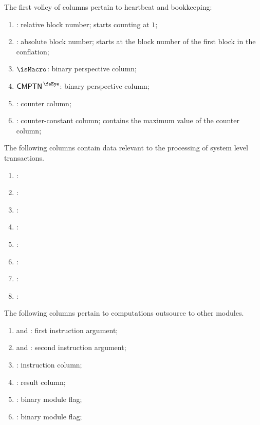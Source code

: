 The first volley of columns pertain to heartbeat and bookkeeping:
\begin{enumerate}
	\item
		\relBlock{}:
		relative block number;
		starts counting at $1$;
	\item
		\absBlock{}:
		absolute block number;
		starts at the block number of the first block in the conflation;
	\item
		$\isMacro$:
		binary perspective column;
	\item
		$\isComputation$:
		binary perspective column;
	\item
		\ct{}:
		counter column;
	\item
		\maxCt{}:
		counter-constant column;
		contains the maximum value of the counter column;
\end{enumerate}
The following columns contain data relevant to the processing of system level transactions.
\begin{enumerate}[resume]
	\item
		\godGiven{}
		\loneTimeStamp{}:
	\item
		\godGiven{}
		\beaconRootHi{}:
	\item
		\godGiven{}
		\beaconRootLo{}:
	\item
		\godGiven{}
		\previousBlockNumber{}:
	\item
		\godGiven{}
		\previousBlockHashHi{}:
	\item
		\godGiven{}
		\previousBlockHashLo{}:
	\item
		\markAsJustifiedHere{}
		\loneTimeStampModulo{}:
	\item
		\markAsJustifiedHere{}
		\previousBlockNumberModulo{}:
\end{enumerate}
The following columns pertain to computations outsource to other modules.
\begin{enumerate}[resume]
	\item
		\computationArgOneHi{} and \computationArgOneLo{}:
		first instruction argument;
	\item
		\computationArgTwoHi{} and \computationArgTwoLo{}:
		second instruction argument;
	\item
		\computationInst:
		instruction column;
	\item
		\computationRes:
		result column;
	\item
		\computationWcpFlag:
		binary \wcpMod{} module flag;
	\item
		\computationEucFlag:
		binary \eucMod{} module flag;
\end{enumerate}
